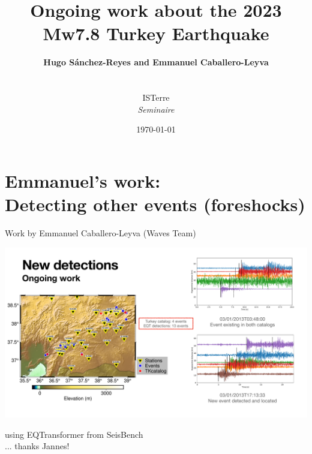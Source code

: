 \documentclass{beamer}
\title{{\normalsize \vskip 1.5cm {\bf Ongoing work about the 2023 Mw7.8 Turkey Earthquake}}}
\author{ {\bf Hugo Sánchez-Reyes and Emmanuel Caballero-Leyva}  
\\ 
\\
\\
\vfill
{ISTerre} \\
\textit{Seminaire}
}
\date[2022]{\today}
\begin{document}

\begin{frame}
    \titlepage
\end{frame}

\section{Emmanuel's work: \\ Detecting other events (foreshocks)}

\begin{frame}
 {Work by Emmanuel Caballero-Leyva (Waves Team)}
 
 \begin{minipage}{1\linewidth}
 \vskip -0.2cm \hskip -0.5cm \includegraphics[width=1.1\linewidth]{images/presentation_TK.pdf} \\
 \end{minipage}

 \vskip -0.5cm
 {\hfill \scriptsize using EQTransformer 
 from SeisBench \\ \hfill \citep{SeisBench} ... thanks Jannes!}

\end{frame}
\end{document}
